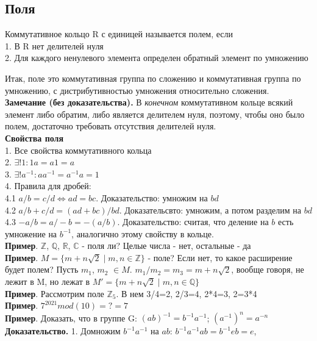 \subsection{Поля}
\begin{defin}
Коммутативное кольцо R с единицей называется полем, если \\
1. В R нет делителей нуля\\
2. Для каждого ненулевого элемента определен обратный элемент по умножению
\end{defin}
Итак, поле это коммутативная группа по сложению и коммутативная группа по 
умножению, с дистрибутивностью умножения относительно сложения.\\ 
\textbf{Замечание (без доказательства).} В \textit{конечном} коммутативном
кольце всякий элемент либо обратим, либо является делителем нуля, поэтому,
чтобы оно было полем, достаточно требовать отсутствия делителей нуля.\\
\textbf{Свойства поля}\\
1. Все свойства коммутативного кольца\\
2. $\exists ! 1: 1a=a1=a$\\
3. $\exists ! a^{-1}: aa^{-1}=a^{-1}a=1$\\
4. Правила для дробей:\\
4.1 $a/b=c/d \Leftrightarrow ad=bc$. Доказательство: умножим на $bd$\\
4.2 $a/b+c/d=(ad+bc)/bd$. Доказательсвто: умножим, а потом разделим на $bd$\\
4.3 $-a/b=a/-b=-(a/b)$. Доказательство: считая, что деление на $b$ есть
умножение на $b^{-1}$, аналогично этому свойству в кольце.\\
\textbf{Пример}. $\mathbb Z$, $\mathbb Q$, $\mathbb R$, $\mathbb C$ - поля ли?
Целые числа - нет, остальные - да \\
\textbf{Пример}. $M=\{m+n\sqrt{2}\mid m,n\in\mathbb Z\}$ - поле? Если нет, то
какое расширение будет полем? Пусть $m_1$, $m_2$ $\in M$.
$m_1/m_2=m_3=m+n\sqrt{2}$, вообще говоря, не лежит в M, но лежат в 
$M'=\{m+n\sqrt{2}\mid m,n\in\mathbb Q\}$ \\
\textbf{Пример}. Рассмотрим поле $\mathbb Z_5$. В нем 3/4=2, 2/3=4, 2*4=3, 2=3*4\\
\textbf{Пример}. $7^{2021}mod(10)=?=7$\\
\textbf{Пример}. Доказать, что в группе G:
$(ab)^{-1}=b^{-1}a^{-1}$; $(a^{-1})^n=a^{-n}$\\
\textbf{Доказательство.} 1. Домножим $b^{-1}a^{-1}$ на $ab$:
$b^{-1}a^{-1}ab=b^{-1}eb=e$,
